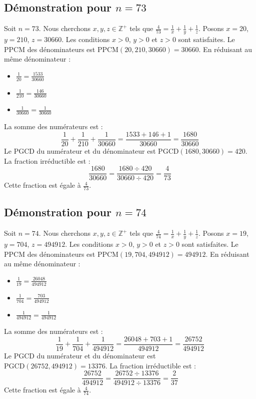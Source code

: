 \documentclass[11pt,a4paper]{article}
\begin{document}
\subsection{Démonstration pour $n = 73$}
Soit $n = 73$. Nous cherchons $x, y, z \in \mathbb{Z}^{+}$ tels que $\frac{4}{73} = \frac{1}{x} + \frac{1}{y} + \frac{1}{z}$.
Posons $x = 20$, $y = 210$, $z = 30660$.
Les conditions $x > 0$, $y > 0$ et $z > 0$ sont satisfaites.
Le PPCM des dénominateurs est $\text{PPCM}(20, 210, 30660) = 30660$.
En réduisant au même dénominateur :
\begin{itemize}
    \item $\frac{1}{20} = \frac{1533}{30660}$
    \item $\frac{1}{210} = \frac{146}{30660}$
    \item $\frac{1}{30660} = \frac{1}{30660}$
\end{itemize}
La somme des numérateurs est :
$$ \frac{1}{20} + \frac{1}{210} + \frac{1}{30660} = \frac{1533 + 146 + 1}{30660} = \frac{1680}{30660} $$
Le PGCD du numérateur et du dénominateur est $\text{PGCD}(1680, 30660) = 420$.
La fraction irréductible est :
$$ \frac{1680}{30660} = \frac{1680 \div 420}{30660 \div 420} = \frac{4}{73} $$
Cette fraction est égale à $\frac{4}{73}$.

\subsection{Démonstration pour $n = 74$}
Soit $n = 74$. Nous cherchons $x, y, z \in \mathbb{Z}^{+}$ tels que $\frac{4}{74} = \frac{1}{x} + \frac{1}{y} + \frac{1}{z}$.
Posons $x = 19$, $y = 704$, $z = 494912$.
Les conditions $x > 0$, $y > 0$ et $z > 0$ sont satisfaites.
Le PPCM des dénominateurs est $\text{PPCM}(19, 704, 494912) = 494912$.
En réduisant au même dénominateur :
\begin{itemize}
    \item $\frac{1}{19} = \frac{26048}{494912}$
    \item $\frac{1}{704} = \frac{703}{494912}$
    \item $\frac{1}{494912} = \frac{1}{494912}$
\end{itemize}
La somme des numérateurs est :
$$ \frac{1}{19} + \frac{1}{704} + \frac{1}{494912} = \frac{26048 + 703 + 1}{494912} = \frac{26752}{494912} $$
Le PGCD du numérateur et du dénominateur est $\text{PGCD}(26752, 494912) = 13376$.
La fraction irréductible est :
$$ \frac{26752}{494912} = \frac{26752 \div 13376}{494912 \div 13376} = \frac{2}{37} $$
Cette fraction est égale à $\frac{4}{74}$.
\end{document}
